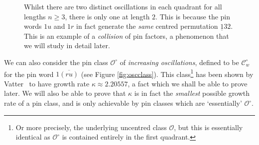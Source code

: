 \documentclass[11pt,a4paper]{article}
\newcommand{\plotptradius}{4pt}
\theoremstyle{definition}
\begin{document}
\begin{figure}[h]
\begin{center}
\end{center}
\caption{Whilst there are two distinct oscillations in each quadrant for all lengths $n \geq 3$, there is only one at length $2$. This is because the pin words $1u$ and $1r$ in fact generate the \emph{same} centred permutation $\underline{1}32$. This is an example of a \emph{collision} of pin factors, a phenomenon that we will study in detail later.}
\label{fig:2osccollision}
\end{figure}

We can also consider the pin class $\mathcal{O}^{\circ}$ of \emph{increasing oscillations}, defined to be $\mathcal{C}^{\circ}_{w}$ for the pin word $1\overline{(ru)}$ (see Figure \ref{fig:oscclass}). This class\footnote{Or more precisely, the underlying uncentred class $\mathcal{O}$, but this is essentially identical as $\mathcal{O}^{\circ}$ is contained entirely in the first quadrant.} has been shown by Vatter~\cite[Proposition 1.10]{vatter:small-permutati:} to have growth rate $\kappa \approx 2.20557$, a fact which we shall be able to prove later. We will also be able to prove that $\kappa$ is in fact the \emph{smallest} possible growth rate of a pin class, and is only achievable by pin classes which are `essentially' $\mathcal{O}^{\circ}$.
\end{document}
